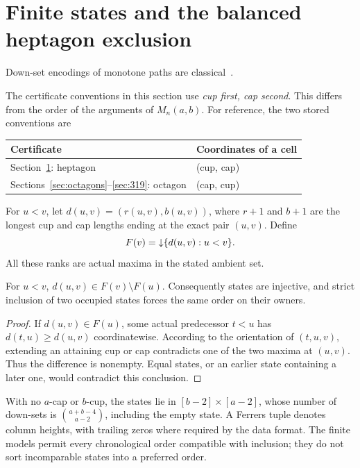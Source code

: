 \section{Finite states and the balanced heptagon exclusion}\label{sec:balanced}
Down-set encodings of monotone paths are classical~\cite{MS,BB}.

The certificate conventions in this section use \emph{cup first, cap
second}. This differs from the order of the arguments of $M_n(a,b)$.
For reference, the two stored conventions are
\begin{center}
\begin{tabular}{ll}
\toprule
Certificate & Coordinates of a cell\\
\midrule
Section~\ref{sec:balanced}: heptagon & (cup, cap)\\
Sections~\ref{sec:octagons}--\ref{sec:319}: octagon & (cap, cup)\\
\bottomrule
\end{tabular}
\end{center}
For $u<v$, let $d(u,v)=(r(u,v),b(u,v))$, where $r+1$ and $b+1$ are
the longest cup and cap lengths ending at the exact pair $(u,v)$.
Define
\begin{equation}\label{eq:states}
 F(v)=\mathord{\downarrow}\{d(u,v):u<v\}.
\end{equation}
All these ranks are actual maxima in the stated ambient set.

\begin{lemma}\label{lem:difference}
For $u<v$, $d(u,v)\in F(v)\setminus F(u)$. Consequently states are
injective, and strict inclusion of two occupied states forces the same
order on their owners.
\end{lemma}
\begin{proof}
If $d(u,v)\in F(u)$, some actual predecessor $t<u$ has
$d(t,u)\ge d(u,v)$ coordinatewise. According to the orientation of
$(t,u,v)$, extending an attaining cup or cap contradicts one of the
two maxima at $(u,v)$. Thus the difference is nonempty. Equal states,
or an earlier state containing a later one, would contradict this
conclusion.
\end{proof}

With no $a$-cap or $b$-cup, the states lie in $[b-2]\times[a-2]$,
whose number of down-sets is $\binom{a+b-4}{a-2}$, including the empty
state. A Ferrers tuple denotes column heights, with trailing zeros
where required by the data format. The finite models permit every
chronological order compatible with inclusion; they do not sort
incomparable states into a preferred order.

